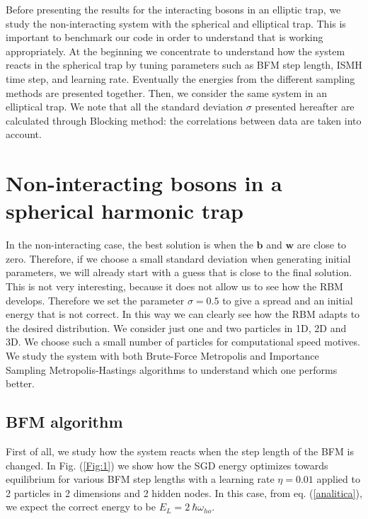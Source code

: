Before presenting the results for the interacting bosons in an elliptic trap, we study the non-interacting system with the spherical and elliptical trap. This is important to benchmark our code in order to understand that is working appropriately. At the beginning we concentrate to understand how the system reacts in the spherical trap by tuning parameters such as BFM step length, ISMH time step, and learning rate. Eventually the energies from the different sampling methods are presented together. Then, we consider the same system in an elliptical trap. 
We note that all the standard deviation $\sigma$ presented hereafter are calculated through Blocking method: the correlations between data are taken into account. 

\section{Non-interacting bosons in a spherical harmonic trap}

In the non-interacting case, the best solution is when the $\boldsymbol{b}$ and $\boldsymbol{w}$ are close to zero. Therefore, if we choose a small standard deviation when generating initial  parameters, we will already start with a guess that is close to the final solution. This is not very interesting, because it does not allow us to see how the RBM develops. Therefore we set the parameter $\sigma=0.5$ to give a spread and an initial energy that is not correct. In this way we can clearly see how the RBM adapts to the desired distribution. We consider just one and two particles in 1D, 2D and 3D. We choose such a small number of particles for computational speed motives. We study the system with both Brute-Force Metropolis and Importance Sampling Metropolis-Hastings algorithms to understand which one performs better.

\subsection{BFM algorithm}
First of all, we study how the system reacts when the step length of the BFM is changed. In Fig. (\ref{Fig:1}) we show how the SGD energy optimizes towards equilibrium for various BFM step lengths with a learning rate $\eta=0.01$ applied to 2 particles in 2 dimensions and 2 hidden nodes. In this case, from eq. (\ref{analitica}), we expect the correct energy to be $E_L=2\ \hbar\omega_{ho}$. 

